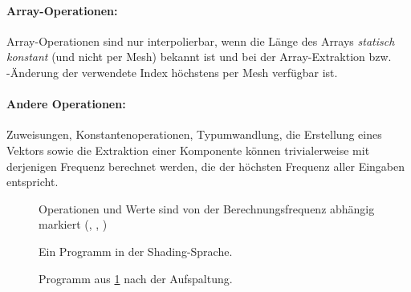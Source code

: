 \documentclass[twoside,a4paper,fleqn,12pt]{book}
\begin{document}


% 

\paragraph{Array-Operationen:} Array-Operationen sind nur interpolierbar, wenn die Länge des Arrays \emph{statisch konstant}
(und nicht per Mesh) bekannt ist und bei der Array-Extraktion bzw. -Änderung der verwendete Index höchstens per Mesh
verfügbar ist.

\paragraph{Andere Operationen:} Zuweisungen, Konstantenoperationen, Typumwandlung, die Erstellung eines Vektors sowie
die Extraktion einer Komponente können trivialerweise mit derjenigen Frequenz berechnet werden, die der höchsten Frequenz
aller Eingaben entspricht.

\begin{figure}[hp]
  
  \caption{Ein Programm in der Shading-Sprache.}
  \centering
  \small Operationen und Werte sind von der Berechnungsfrequenz abhängig markiert (, , )
  \label{fig:simple_s1}
\end{figure}

\begin{figure}[!ht]
  \centering
  
  \caption{Programm aus \ref{fig:simple_s1} nach der Aufspaltung.}
  \label{fig:simple_s1_split}
\end{figure}
\end{document}
